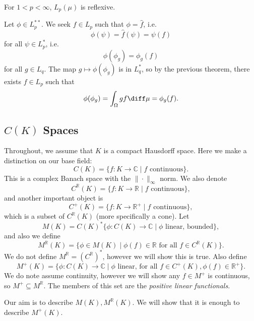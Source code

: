 \documentclass[12pt]{article}
\begin{document}
\begin{corollary}
	For $1 < p < \infty$, $L_p(\mu)$ is reflexive.
\end{corollary}

\begin{proofbox}
	Let $\phi \in L_p^{\ast\ast}$. We seek $f \in L_p$ such that $\phi = \hat f$, i.e.
	\[
	\phi(\psi) = \hat f(\psi) = \psi(f)
	\]
	for all $\psi \in L_p^\ast$, i.e.
	\[
	\phi(\phi_g) = \phi_g(f)
	\]
	for all $g \in L_q$. The map $g \mapsto \phi(\phi_g)$ is in $L_q^\ast$, so by the previous theorem, there exists $f \in L_p$ such that
	\[
	\phi(\phi_g) = \int_{\Omega} g f \diff \mu = \phi_g(f).
	\]
\end{proofbox}

\subsection{\texorpdfstring{$C(K)$}{C(K)} Spaces}%
\label{sub:ck_sp}

Throughout, we assume that $K$ is a compact Hausdorff space. Here we make a distinction on our base field:
\[
	C(K) = \{f : K \to \mathbb{C} \mid f \text{ continuous}\}.
\]
This is a complex Banach space with the $\|\cdot\|_\infty$ norm. We also denote
\[
	C^{\mathbb{R}}(K) = \{f : K \to \mathbb{R} \mid f \text{ continuous}\},
\]
and another important object is
\[
	C^+(K) = \{f : K \to \mathbb{R}^+ \mid f \text{ continuous}\},
\]
which is a subset of $C^{\mathbb{R}}(K)$ (more specifically a cone). Let
\[
	M(K) = C(K)^\ast \{ \phi : C(K) \to \mathbb{C} \mid \phi \text{ linear, bounded}\},
\]
and also we define
\[
	M^{\mathbb{R}}(K) = \{\phi \in M(K) \mid \phi(f) \in \mathbb{R} \text{ for all } f \in C^{\mathbb{R}}(K)\}.
\]
We do not define $M^{\mathbb{R}} = (C^{\mathbb{R}})^\ast$, however we will show this is true. Also define
\[
	M^+(K) = \{\phi : C(K) \to \mathbb{C} \mid \phi \text{ linear, for all } f \in C^+(K), \phi(f) \in \mathbb{R}^+\}.
\] 
We do note assume continuity, however we will show any $f \in M^+$ is continuous, so $M^+ \subseteq M^\mathbb{R}$. The members of this set are the \emph{positive linear functionals}.

Our aim is to describe $M(K), M^{\mathbb{R}}(K)$. We will show that it is enough to describe $M^+(K)$.
\end{document}
